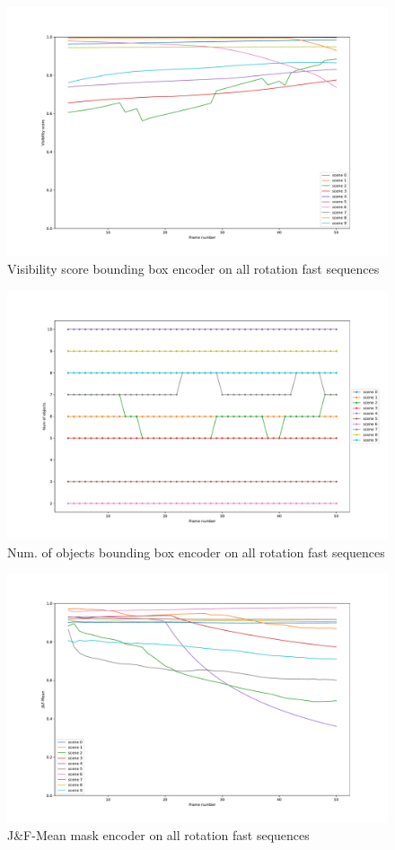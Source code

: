 \begin{figure} [ht!]
    \centering
    \includegraphics[trim={ 0 2cm 0 2.5cm},width=0.6\linewidth]{figures/appendix/5_bbox_att_fpn_fast_rotation-visibility.pdf}
    \caption{Visibility score bounding box encoder on all rotation fast sequences}
    \label{fig:bbox_visibility}
    
\end{figure}
\begin{figure} [ht!]
    \centering
    \includegraphics[trim={ 0 2cm 0 2.5cm},width=0.6\linewidth]{figures/appendix/5_bbox_att_fpn_fast_rotation-crowdness.pdf}
    \caption{Num. of objects bounding box encoder on all rotation fast sequences}
    \label{fig:bbox_crowdness}
    
\end{figure}

\begin{figure} [ht!]
    \centering
    \includegraphics[trim={ 0 2cm 0 1.75cm},width=0.6\linewidth]{figures/appendix/6_mask_att_fpn_fast_rotation-J_F.pdf}
    \caption{J\&F-Mean mask encoder on all rotation fast sequences}
    \label{fig:mask_j_f}
    
\end{figure}

